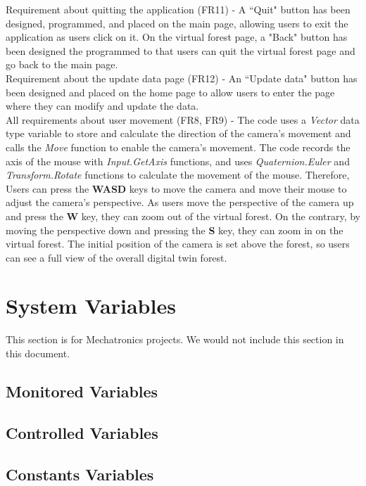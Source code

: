 \documentclass[12pt, titlepage]{article}
\begin{document}
\noindent Requirement about quitting the application (FR11) - A ``Quit" button has been designed, programmed, and placed on the main page, allowing users to exit the application as users click on it. On the virtual forest page, a "Back" button has been designed the programmed to that users can quit the virtual forest page and go back to the main page.\\

\noindent Requirement about the update data page (FR12) - An ``Update data" button has been designed and placed on the home page to allow users to enter the page where they can modify and update the data.\\

\noindent All requirements about user movement (FR8, FR9) - The code uses a \textit{Vector} data type variable to store and calculate the direction of the camera's movement and calls the \textit{Move} function to enable the camera's movement. The code records the axis of the mouse with \textit{Input.GetAxis} functions, and uses \textit{Quaternion.Euler} and \textit{Transform.Rotate} functions to calculate the movement of the mouse. Therefore, Users can press the \textbf{WASD} keys to move the camera and move their mouse to adjust the camera's perspective. As users move the perspective of the camera up and press the \textbf{W} key, they can zoom out of the virtual forest. On the contrary, by moving the perspective down and pressing the \textbf{S} key, they can zoom in on the virtual forest. The initial position of the camera is set above the forest, so users can see a full view of the overall digital twin forest.

\section{System Variables}

This section is for Mechatronics projects. We would not include this section in this document. 

\subsection{Monitored Variables}

\subsection{Controlled Variables}

\subsection{Constants Variables}
\end{document}
